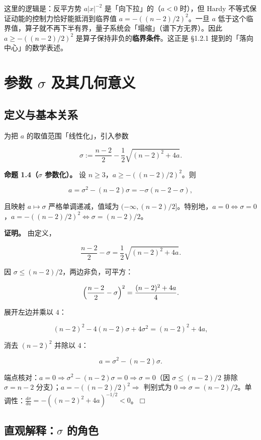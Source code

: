 \documentclass[a4paper,11pt,openany]{ctexbook}
\numberwithin{equation}{chapter}
\numberwithin{figure}{chapter}
\numberwithin{table}{chapter}
\begin{document}
\begin{intuitionbox}
这里的逻辑是：反平方势 $a|x|^{-2}$ 是「向下拉」的（$a<0$ 时），但 Hardy 不等式保证动能的控制力恰好能抵消到临界值 $a=-((n-2)/2)^2$。一旦 $a$ 低于这个临界值，算子就不再下半有界，量子系统会「塌缩」（谱下方无界）。因此 $a\ge-((n-2)/2)^2$ 是算子保持非负的\textbf{临界条件}。这正是 §1.2.1 提到的「落向中心」的数学表述。
\end{intuitionbox}

\section{参数 $\sigma$ 及其几何意义}

\subsection{定义与基本关系}

为把 $a$ 的取值范围「线性化」，引入参数

$$\sigma := \frac{n-2}{2}-\frac{1}{2}\sqrt{(n-2)^2+4a}.$$

\textbf{命题 1.4（$\sigma$ 参数化）。} 设 $n\ge 3$，$a\ge-((n-2)/2)^2$。则

$$a=\sigma^2-(n-2)\sigma=-\sigma(n-2-\sigma),$$

且映射 $a\mapsto\sigma$ 严格单调递减，值域为 $(-\infty,(n-2)/2]$。特别地，$a=0\iff\sigma=0$，$a=-((n-2)/2)^2\iff\sigma=(n-2)/2$。

\textbf{证明。} 由定义，

$$\frac{n-2}{2}-\sigma = \frac12\sqrt{(n-2)^2+4a}.$$

因 $\sigma\le(n-2)/2$，两边非负，可平方：

$$\Bigl(\frac{n-2}{2}-\sigma\Bigr)^2 = \frac{(n-2)^2+4a}{4}.$$

展开左边并乘以 $4$：

$$(n-2)^2-4(n-2)\sigma+4\sigma^2 = (n-2)^2+4a,$$

消去 $(n-2)^2$ 并除以 $4$：

$$a=\sigma^2-(n-2)\sigma.$$

端点核对：$a=0\Rightarrow\sigma^2-(n-2)\sigma=0\Rightarrow\sigma=0$（因 $\sigma\le(n-2)/2$ 排除 $\sigma=n-2$ 分支）；$a=-((n-2)/2)^2\Rightarrow$ 判别式为 $0\Rightarrow\sigma=(n-2)/2$。单调性：$\frac{d\sigma}{da}=-( (n-2)^2+4a)^{-1/2}<0$。$\Box$

\subsection{直观解释：$\sigma$ 的角色}
\end{document}
